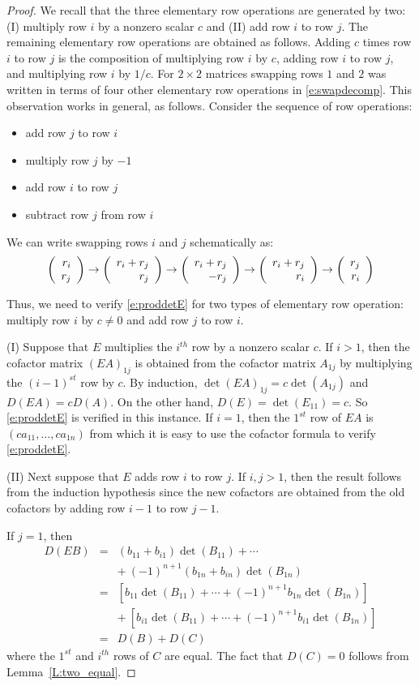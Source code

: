 \documentclass{ximera}
\begin{document}
\begin{proof}  
We recall that the three elementary row operations are 
generated by two: (I) multiply row $i$ by a nonzero scalar $c$ and (II) 
add row $i$ to row $j$.  The remaining elementary row operations are 
obtained as follows. Adding $c$ times row $i$ to row $j$ is the composition 
of multiplying row $i$ by $c$, adding row $i$ to row $j$, and multiplying row 
$i$ by $1/c$.  For $2\times 2$ matrices swapping rows $1$ and $2$ was 
written in terms of four other elementary row operations in \eqref{e:swapdecomp}.   
This observation works in general, as follows.  Consider the sequence 
of row operations:
\begin{itemize}
\item	add row $j$ to row $i$
\item multiply row $j$ by $-1$
\item add row $i$ to row $j$
\item subtract row $j$ from row $i$
\end{itemize}
We can write swapping rows $i$ and $j$ schematically as:
\[
\left(\begin{array}{rrrrrrrrrrrrrrrrrr} r_i \\ r_j \end{array}\right) \to \left(\begin{array}{rrrrrrrrrrrrrrrrrr} r_i + r_j \\ r_j \end{array}\right) \to  \left(\begin{array}{rrrrrrrrrrrrrrrrrr} r_i + r_j \\ -r_j \end{array}\right)
\to   \left(\begin{array}{rrrrrrrrrrrrrrrrrr} r_i + r_j \\ r_i \end{array}\right) \to  \left(\begin{array}{rrrrrrrrrrrrrrrrrr} r_j \\ r_i \end{array}\right)
\]

Thus, we need to verify \eqref{e:proddetE} for two types of
elementary row operation: multiply row $i$ by $c\neq 0$ and add 
row $j$ to row $i$. 

\noindent (I) Suppose that $E$ multiplies the $i^{th}$ row by a
nonzero scalar $c$.  If $i>1$, then the cofactor matrix
$(EA)_{1j}$ is obtained from the cofactor matrix $A_{1j}$ by
multiplying the $(i-1)^{st}$ row by $c$.  By induction,
$\det(EA)_{1j}= c\det(A_{1j})$ and $D(EA)=cD(A)$.  On the other
hand, $D(E)=\det(E_{11})=c$.  So \eqref{e:proddetE} is verified in
this instance.  If $i=1$, then the $1^{st}$ row of $EA$ is
$(ca_{11},\ldots,ca_{1n})$ from which it is easy to use the cofactor 
formula to verify \eqref{e:proddetE}.

\noindent (II) Next suppose that $E$ adds row $i$ to row $j$.  If  
$i,j > 1$, then the result follows from the induction hypothesis 
since the new cofactors are obtained from the old cofactors by 
adding row $i-1$ to row $j-1$. 

If $j=1$, then 
\begin{eqnarray*}
  D(EB) & = & (b_{11} + b_{i1})\det(B_{11}) +\cdots \\
   & & +\ (-1)^{n+1}(b_{1n}+ b_{in})\det(B_{1n})\\
& = &
\left[b_{11}\det(B_{11})+\cdots+(-1)^{n+1}b_{1n}\det(B_{1n})\right]  \\
& & +\  \left[b_{i1}\det(B_{11})+\cdots+(-1)^{n+1}b_{i1}\det(B_{1n})\right]\\
& = & D(B) + D(C)
\end{eqnarray*}
where the $1^{st}$ and $i^{th}$ rows of $C$ are equal.  The fact that $D(C)=0$ 
follows from Lemma~\ref{L:two_equal}.


\end{proof}
\end{document}
